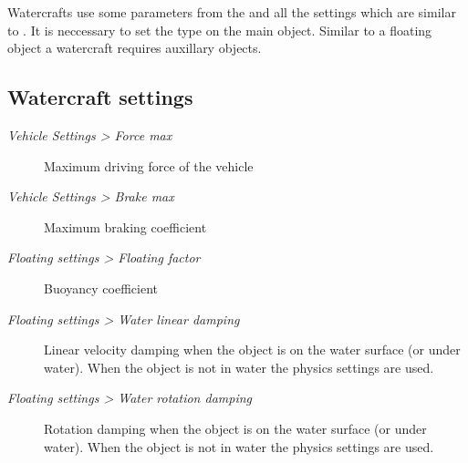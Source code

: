 \documentclass[a4paper,12pt,oneside]{sphinxmanual}
\begin{document}
Watercrafts use some parameters from the  and all the settings which are similar to . It is neccessary to set the  type  on the main object. Similar to a floating object a watercraft requires auxillary  objects.


\subsection{Watercraft settings}
\label{physics:id10}\begin{description}
\item[{\emph{Vehicle Settings \textgreater{} Force max}}] \leavevmode
Maximum driving force of the vehicle

\item[{\emph{Vehicle Settings \textgreater{} Brake max}}] \leavevmode
Maximum braking coefficient

\item[{\emph{Floating settings \textgreater{} Floating factor}}] \leavevmode
Buoyancy coefficient

\item[{\emph{Floating settings \textgreater{} Water linear damping}}] \leavevmode
Linear velocity damping when the object is on the water surface (or under water). When the object is not in water the physics settings are used.

\item[{\emph{Floating settings \textgreater{} Water rotation damping}}] \leavevmode
Rotation damping when the object is on the water surface (or under water). When the object is not in water the physics settings are used.

\end{description}
\end{document}
